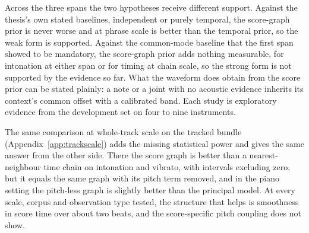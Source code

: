 
Across the three spans the two hypotheses receive different support.
Against the thesis's own stated baselines, independent or purely temporal,
the score-graph prior is never worse and at phrase scale is better than
the temporal prior, so the weak form is supported. Against the common-mode
baseline that the first span showed to be mandatory, the score-graph prior
adds nothing measurable, for intonation at either span or for timing at
chain scale, so the strong form is not supported by the evidence so far.
What the waveform does obtain from the score prior can be stated plainly: a
note or a joint with no acoustic evidence inherits its context's common
offset with a calibrated band. Each study is exploratory evidence from the
development set on four to nine instruments.

The same comparison at whole-track scale on the tracked bundle
(Appendix~\ref{app:trackscale}) adds the missing statistical power and
gives the same answer from the other side. There the score graph is better
than a nearest-neighbour time chain on intonation and vibrato, with
intervals excluding zero, but it equals the same graph with its pitch term
removed, and in the piano setting the pitch-less graph is slightly better
than the principal model. At every scale, corpus and observation type
tested, the structure that helps is smoothness in score time over about two
beats, and the score-specific pitch coupling does not show.


